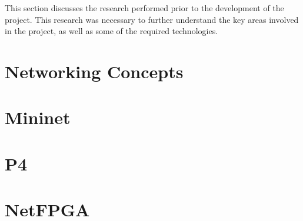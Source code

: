 This section discusses the research performed prior to the development of the project. This research was necessary to further understand the key areas involved in the project, as well as some of the required technologies.


\section{Networking Concepts}
\label{networking_concepts_research}


\section{Mininet}
\label{mininet}


\section{P4}
\label{p4}


\section{NetFPGA}
\label{netfpga}

